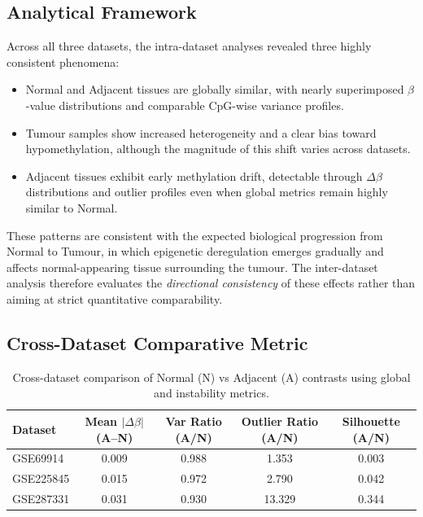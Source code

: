 \subsection{Analytical Framework}

Across all three datasets, the intra-dataset analyses revealed three highly consistent phenomena:

\begin{itemize}[label=-]
    \item Normal and Adjacent tissues are globally similar, with nearly superimposed $\beta$-value distributions and
    comparable CpG-wise variance profiles.
    \item Tumour samples show increased heterogeneity and a clear bias toward hypomethylation, although the magnitude
    of this shift varies across datasets.
    \item Adjacent tissues exhibit early methylation drift, detectable through $\Delta\beta$ distributions and outlier 
    profiles even when global metrics remain highly similar to Normal.
\end{itemize}

These patterns are consistent with the expected biological progression from Normal to Tumour, in which epigenetic 
deregulation emerges gradually and affects normal-appearing tissue surrounding the tumour.  
The inter-dataset analysis therefore evaluates the \textit{directional consistency} of these effects rather than aiming 
at strict quantitative comparability.

\subsection{Cross-Dataset Comparative Metric}

\begin{table}[t]
\centering
\caption{Cross-dataset comparison of Normal (N) vs Adjacent (A) contrasts using global and instability metrics.}
\label{tab:inter_summary_NA}
\scriptsize
\begin{tabular}{lcccc}
\toprule
\textbf{Dataset} &
\textbf{Mean $|\Delta\beta|$ (A--N)} &
\textbf{Var Ratio (A/N)} &
\textbf{Outlier Ratio (A/N)} &
\textbf{Silhouette (A/N)} \\
\midrule
GSE69914 &
0.009 &
0.988 &
1.353 &
0.003 \\
GSE225845 &
0.015 &
0.972 &
2.790 &
0.042 \\
GSE287331 &
0.031 &
0.930 &
13.329 &
0.344 \\
\bottomrule
\end{tabular}
\end{table}

